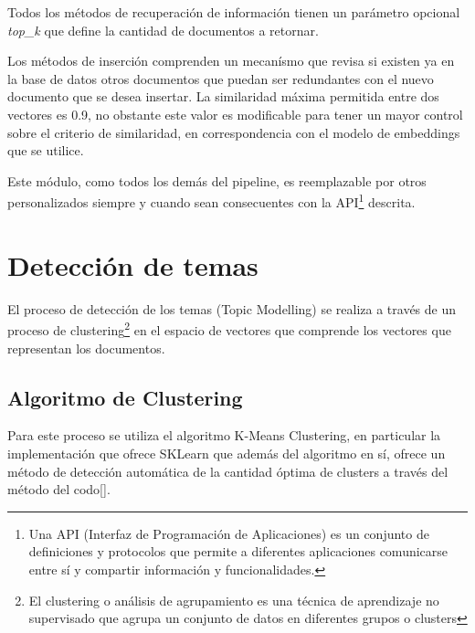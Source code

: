         Todos los métodos de recuperación de información tienen un parámetro opcional \emph{top\_k} que define la cantidad de documentos a retornar.

        Los métodos de inserción comprenden un mecanísmo que revisa si existen ya en la base de datos otros documentos que puedan ser redundantes con el nuevo documento que se desea insertar. La similaridad máxima permitida entre dos vectores es 0.9, no obstante este valor es modificable para tener un mayor control sobre el criterio de similaridad, en correspondencia con el modelo de embeddings que se utilice.

        Este módulo, como todos los demás del pipeline, es reemplazable por otros personalizados siempre y cuando sean consecuentes con la API\footnote{Una API (Interfaz de Programación de Aplicaciones) es un conjunto de definiciones y protocolos que permite a diferentes aplicaciones comunicarse entre sí y compartir información y funcionalidades.} descrita.

\section{Detección de temas}
    El proceso de detección de los temas (Topic Modelling) se realiza a través de un proceso de clustering\footnote{El clustering o análisis de agrupamiento es una técnica de aprendizaje no supervisado que agrupa un conjunto de datos en diferentes grupos o clusters} en el espacio de vectores que comprende los vectores que representan los documentos.

    \subsection{Algoritmo de Clustering}
        Para este proceso se utiliza el algoritmo K-Means Clustering, en particular la implementación que ofrece SKLearn\cite{sklearn} que además del algoritmo en sí, ofrece un método de detección automática de la cantidad óptima de clusters a través del método del codo[\cite{elbow}].
    
